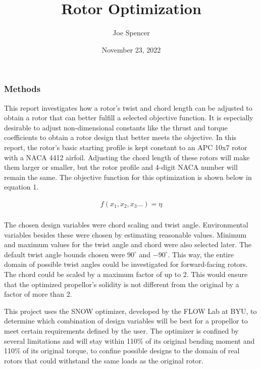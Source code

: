 \documentclass{article}
\begin{document}
\author{Joe Spencer}
\title{Rotor Optimization}
\date{November 23, 2022}
\maketitle

\subsubsection*{Methods}

This report investigates how a rotor's twist and chord length can be adjusted to obtain a rotor that can better fulfill a selected objective function. It is especially desirable to adjust non-dimensional constants like the thrust and torque coefficients to obtain a rotor design that better meets the objective. In this report, the rotor's basic starting profile is kept constant to an APC 10x7 rotor with a NACA 4412 airfoil. Adjusting the chord length of these rotors will make them larger or smaller, but the rotor profile and 4-digit NACA number will remain the same. The objective function for this optimization is shown below in equation 1. \newline

\begin{equation}
\begin{aligned}
	f(x_{1}, x_{2}, x_{3}...) = \eta \\
\end{aligned}
\end{equation} \newline

\noindent The chosen design variables were chord scaling and twist angle. Environmental variables besides these were chosen by estimating reasonable values. Minimum and maximum values for the twist angle and chord were also selected later. The default twist angle bounds chosen were $90^{\circ}$ and $-90^{\circ}$. This way, the entire domain of possible twist angles could be investigated for forward-facing rotors. The chord could be scaled by a maximum factor of up to 2. This would ensure that the optimized propellor's solidity is not different from the original by a factor of more than 2. \newline

\noindent This project uses the SNOW optimizer, developed by the FLOW Lab at BYU, to determine which combination of design variables will be best for a propellor to meet certain requirements defined by the user. The optimizer is confined by several limitations and will stay within 110\% of its original bending moment and 110\% of its original torque, to confine possible designs to the domain of real rotors that could withstand the same loads as the original rotor. \newline
\end{document}
